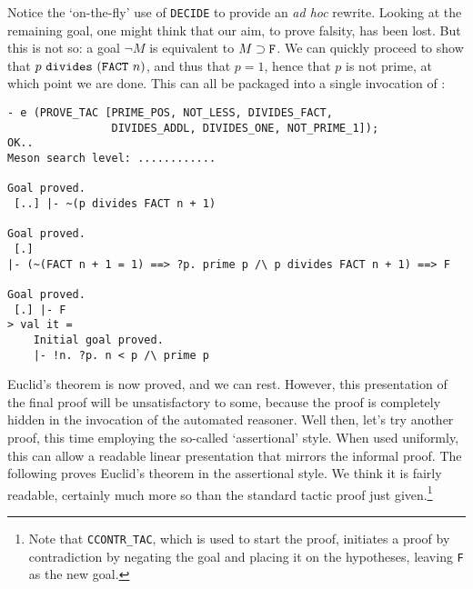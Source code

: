 Notice the `on-the-fly' use of \verb+DECIDE+ to provide an {\it ad hoc\/}
rewrite. Looking at the remaining goal, one might think that our aim, to
prove falsity, has been lost. But this is not so: a goal $\neg
M$ is equivalent to $M \supset \mbox{\tt F}$. We can quickly proceed to
show that $p \ \mbox{\tt divides}\ (\mbox{\tt FACT}\ n)$, and thus that
$p = 1$, hence that $p$ is not prime, at which point we are done. This
can all be packaged into a single invocation of :
\begin{session}\begin{verbatim}
- e (PROVE_TAC [PRIME_POS, NOT_LESS, DIVIDES_FACT,
                DIVIDES_ADDL, DIVIDES_ONE, NOT_PRIME_1]);
OK..
Meson search level: ............

Goal proved.
 [..] |- ~(p divides FACT n + 1)

Goal proved.
 [.]
|- (~(FACT n + 1 = 1) ==> ?p. prime p /\ p divides FACT n + 1) ==> F

Goal proved.
 [.] |- F
> val it =
    Initial goal proved.
    |- !n. ?p. n < p /\ prime p
\end{verbatim}\end{session}
    Euclid's theorem is now proved, and we can rest. However, this
    presentation of the final proof will be unsatisfactory to some,
    because the proof is completely hidden in the invocation of the
    automated reasoner. Well then, let's try another proof, this time
    employing the so-called `assertional' style. When used uniformly,
    this can allow a readable linear presentation that mirrors the
    informal proof. The following proves Euclid's theorem in the
    assertional style. We think it is fairly readable, certainly much
    more so than the standard tactic proof just given.\footnote{Note
      that {\tt CCONTR\_TAC}, which is used to start the proof,
      initiates a proof by contradiction by negating the goal and
      placing it on the hypotheses, leaving {\tt F} as the new goal.}

